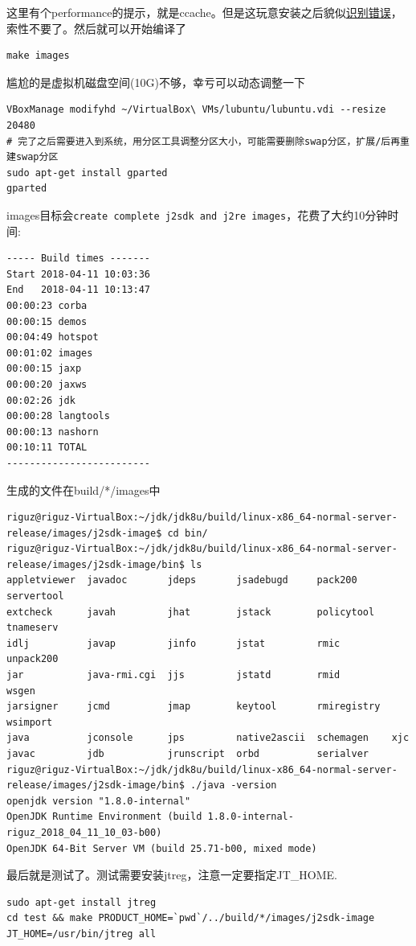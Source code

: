 \documentclass[12pt]{article}
\begin{document}
这里有个performance的提示，就是ccache。但是这玩意安装之后貌似\href{https://bugs.openjdk.java.net/browse/JDK-8067132}{识别错误}，索性不要了。然后就可以开始编译了

\begin{verbatim}
make images
\end{verbatim}

尴尬的是虚拟机磁盘空间(10G)不够，幸亏可以动态调整一下

\begin{verbatim}
VBoxManage modifyhd ~/VirtualBox\ VMs/lubuntu/lubuntu.vdi --resize 20480
# 完了之后需要进入到系统，用分区工具调整分区大小，可能需要删除swap分区，扩展/后再重建swap分区
sudo apt-get install gparted
gparted
\end{verbatim}

images目标会\texttt{create\ complete\ j2sdk\ and\ j2re\ images}，花费了大约10分钟时间:

\begin{verbatim}
----- Build times -------
Start 2018-04-11 10:03:36
End   2018-04-11 10:13:47
00:00:23 corba
00:00:15 demos
00:04:49 hotspot
00:01:02 images
00:00:15 jaxp
00:00:20 jaxws
00:02:26 jdk
00:00:28 langtools
00:00:13 nashorn
00:10:11 TOTAL
-------------------------
\end{verbatim}

生成的文件在build/*/images中

\begin{verbatim}
riguz@riguz-VirtualBox:~/jdk/jdk8u/build/linux-x86_64-normal-server-release/images/j2sdk-image$ cd bin/
riguz@riguz-VirtualBox:~/jdk/jdk8u/build/linux-x86_64-normal-server-release/images/j2sdk-image/bin$ ls
appletviewer  javadoc       jdeps       jsadebugd     pack200      servertool
extcheck      javah         jhat        jstack        policytool   tnameserv
idlj          javap         jinfo       jstat         rmic         unpack200
jar           java-rmi.cgi  jjs         jstatd        rmid         wsgen
jarsigner     jcmd          jmap        keytool       rmiregistry  wsimport
java          jconsole      jps         native2ascii  schemagen    xjc
javac         jdb           jrunscript  orbd          serialver
riguz@riguz-VirtualBox:~/jdk/jdk8u/build/linux-x86_64-normal-server-release/images/j2sdk-image/bin$ ./java -version
openjdk version "1.8.0-internal"
OpenJDK Runtime Environment (build 1.8.0-internal-riguz_2018_04_11_10_03-b00)
OpenJDK 64-Bit Server VM (build 25.71-b00, mixed mode)
\end{verbatim}

最后就是测试了。测试需要安装jtreg，注意一定要指定JT\_HOME.

\begin{verbatim}
sudo apt-get install jtreg
cd test && make PRODUCT_HOME=`pwd`/../build/*/images/j2sdk-image JT_HOME=/usr/bin/jtreg all
\end{verbatim}
\end{document}
